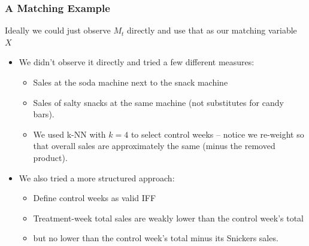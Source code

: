 \documentclass[aspectratio=169,11pt]{beamer}
\begin{document}
\begin{frame}
\frametitle{A Matching Example}
Ideally we could just observe $M_t$ directly and use that as our matching variable $X$
\begin{itemize}
\item We didn't observe it directly and tried a few different measures:
\begin{itemize}
\item Sales at the soda machine next to the snack machine
\item Sales of salty snacks at the same machine (not substitutes for candy bars).
\item We used k-NN with $k=4$ to select control weeks -- notice we re-weight so that overall sales are approximately the same (minus the removed product).
\end{itemize}
\item We also tried a more structured approach:
\begin{itemize}
\item Define control weeks as valid IFF
\item Treatment-week total sales are weakly lower than the control week's total
\item but no lower than the control week's total minus its Snickers sales.
\end{itemize}
\end{itemize}
\end{frame}
\end{document}
